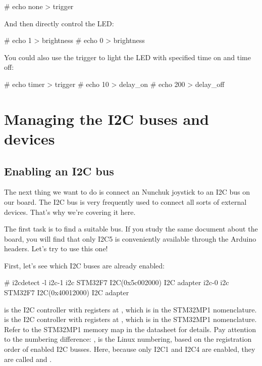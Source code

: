 {\begin{bashinput}
# echo none > trigger
\end{bashinput}

And then directly control the LED:

\begin{bashinput}
# echo 1 > brightness
# echo 0 > brightness
\end{bashinput}

You could also use the  trigger to light the LED
with specified time on and time off:

\begin{bashinput}
# echo timer > trigger
# echo 10 > delay_on
# echo 200 > delay_off
\end{bashinput}

\section{Managing the I2C buses and devices}

\subsection{Enabling an I2C bus}

The next thing we want to do is connect an Nunchuk joystick
to an I2C bus on our board. The I2C bus is very frequently used
to connect all sorts of external devices. That's why we're covering
it here.

The first task is to find a suitable bus. If you study the
same document about the board, you will find that only I2C5 is
conveniently available through the Arduino headers. Let's try
to use this one!

First, let's see which I2C buses are already enabled:

\begin{bashinput}
# i2cdetect -l
i2c-1	i2c             STM32F7 I2C(0x5c002000)                 I2C adapter
i2c-0	i2c             STM32F7 I2C(0x40012000)                 I2C adapter
\end{bashinput}

 is the I2C controller with registers at
, which is  in the STM32MP1
nomenclature.  is the I2C controller with registers at
, which is  in the STM32MP1
nomenclature. Refer to the STM32MP1 memory map in the datasheet for
details. Pay attention to the numbering difference: ,
 is the Linux numbering, based on the registration order
of enabled I2C busses. Here, because only I2C1 and I2C4 are enabled,
they are called  and .

}
